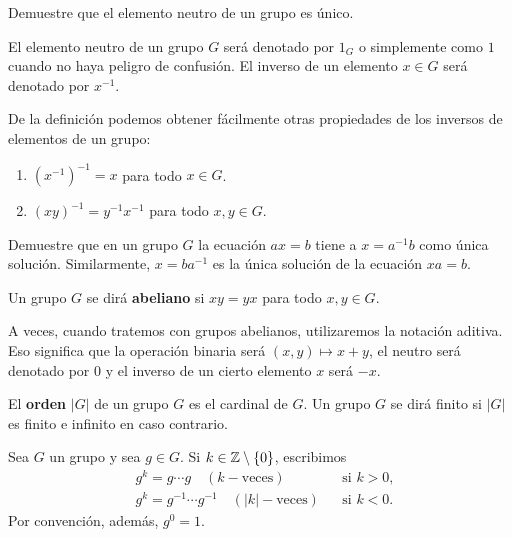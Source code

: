 \begin{exercise}
	Demuestre que el elemento neutro de un grupo es único. 
\end{exercise}

El elemento neutro de un grupo $G$ será denotado por $1_G$ o simplemente como
$1$ cuando no haya peligro de confusión. El inverso de un elemento $x\in G$ será denotado por $x^{-1}$. 

De la definición podemos obtener fácilmente otras propiedades de los inversos de elementos de un grupo:
\begin{enumerate}
	\item $(x^{-1})^{-1}=x$ para todo $x\in G$.
	\item $(xy)^{-1}=y^{-1}x^{-1}$ para todo $x,y\in G$. 
\end{enumerate}
	
\begin{exercise}
	Demuestre que en un grupo $G$ la ecuación $ax=b$ tiene a $x=a^{-1}b$ como
	única solución. Similarmente, $x=ba^{-1}$ es la única solución de la
	ecuación $xa=b$. 
\end{exercise}

\begin{definition}
	Un grupo $G$ se dirá \textbf{abeliano} si $xy=yx$ para todo $x,y\in G$.
\end{definition}

A veces, cuando tratemos con grupos abelianos, utilizaremos la notación
aditiva. Eso significa que la operación binaria será $(x,y)\mapsto x+y$, el neutro será denotado por $0$ 
y el inverso de un cierto elemento $x$ será $-x$. 

\begin{definition}
El \textbf{orden} $|G|$ de un grupo $G$ es el cardinal de $G$. Un grupo $G$ se dirá finito
si $|G|$ es finito e infinito en caso contrario. 
\end{definition}

\begin{notation}
	Sea $G$ un grupo y sea $g\in G$. Si $k\in\mathbb{Z}\setminus\{0\}$, escribimos 
	\begin{align*}
		& g^k=g\cdots g\quad (k-\text{veces}) && \text{si $k>0$},\\
		& g^k=g^{-1}\cdots g^{-1}\quad (|k|-\text{veces}) && \text{si $k<0$}.
	\end{align*}
	Por convención, además, $g^0=1$. 
\end{notation}

